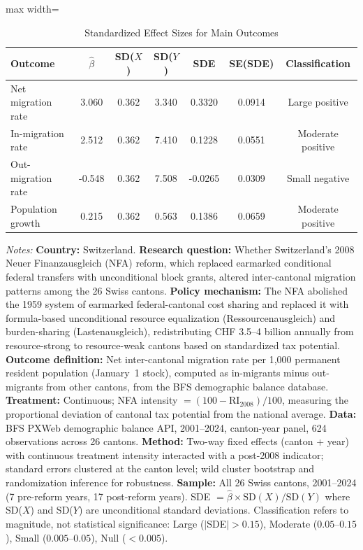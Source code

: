 \begin{table}[H]
\centering
\caption{Standardized Effect Sizes for Main Outcomes}
\begin{threeparttable}
\begin{adjustbox}{max width=\textwidth}
\begin{tabular}{lcccccc}
\toprule
Outcome & $\hat{\beta}$ & SD($X$) & SD($Y$) & SDE & SE(SDE) & Classification \\
\midrule
Net migration rate & 3.060 & 0.362 & 3.340 & 0.3320 & 0.0914 & Large positive \\
In-migration rate & 2.512 & 0.362 & 7.410 & 0.1228 & 0.0551 & Moderate positive \\
Out-migration rate & -0.548 & 0.362 & 7.508 & -0.0265 & 0.0309 & Small negative \\
Population growth & 0.215 & 0.362 & 0.563 & 0.1386 & 0.0659 & Moderate positive \\
\bottomrule
\end{tabular}
\end{adjustbox}
\begin{tablenotes}[flushleft]
\small
\item \textit{Notes:}
\textbf{Country:} Switzerland.
\textbf{Research question:} Whether Switzerland's 2008 Neuer Finanzausgleich (NFA) reform, which replaced earmarked conditional federal transfers with unconditional block grants, altered inter-cantonal migration patterns among the 26 Swiss cantons.
\textbf{Policy mechanism:} The NFA abolished the 1959 system of earmarked federal-cantonal cost sharing and replaced it with formula-based unconditional resource equalization (Ressourcenausgleich) and burden-sharing (Lastenausgleich), redistributing CHF 3.5--4 billion annually from resource-strong to resource-weak cantons based on standardized tax potential.
\textbf{Outcome definition:} Net inter-cantonal migration rate per 1,000 permanent resident population (January~1 stock), computed as in-migrants minus out-migrants from other cantons, from the BFS demographic balance database.
\textbf{Treatment:} Continuous; NFA intensity $= (100 - \text{RI}_{2008})/100$, measuring the proportional deviation of cantonal tax potential from the national average.
\textbf{Data:} BFS PXWeb demographic balance API, 2001--2024, canton-year panel, 624 observations across 26 cantons.
\textbf{Method:} Two-way fixed effects (canton + year) with continuous treatment intensity interacted with a post-2008 indicator; standard errors clustered at the canton level; wild cluster bootstrap and randomization inference for robustness.
\textbf{Sample:} All 26 Swiss cantons, 2001--2024 (7 pre-reform years, 17 post-reform years).
SDE $= \hat{\beta} \times \text{SD}(X) / \text{SD}(Y)$ where SD($X$) and SD($Y$) are unconditional standard deviations.
Classification refers to magnitude, not statistical significance: Large ($|$SDE$| > 0.15$), Moderate ($0.05$--$0.15$), Small ($0.005$--$0.05$), Null ($< 0.005$).
\end{tablenotes}
\end{threeparttable}
\label{tab:sde}
\end{table}

